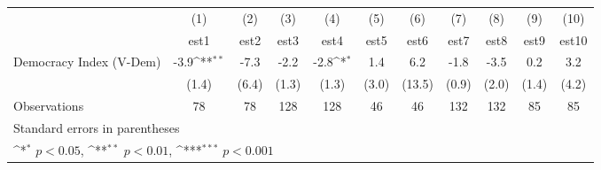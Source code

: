 {
\def\sym#1{\ifmmode^{#1}\else\(^{#1}\)\fi}
\begin{tabular}{l*{10}{c}}
\hline\hline
                    &\multicolumn{1}{c}{(1)}         &\multicolumn{1}{c}{(2)}         &\multicolumn{1}{c}{(3)}         &\multicolumn{1}{c}{(4)}         &\multicolumn{1}{c}{(5)}         &\multicolumn{1}{c}{(6)}         &\multicolumn{1}{c}{(7)}         &\multicolumn{1}{c}{(8)}         &\multicolumn{1}{c}{(9)}         &\multicolumn{1}{c}{(10)}         \\
                    &        est1         &        est2         &        est3         &        est4         &        est5         &        est6         &        est7         &        est8         &        est9         &       est10         \\
\hline
Democracy Index (V-Dem)&        -3.9\sym{**} &        -7.3         &        -2.2         &        -2.8\sym{*}  &         1.4         &         6.2         &        -1.8         &        -3.5         &         0.2         &         3.2         \\
                    &       (1.4)         &       (6.4)         &       (1.3)         &       (1.3)         &       (3.0)         &      (13.5)         &       (0.9)         &       (2.0)         &       (1.4)         &       (4.2)         \\
\hline
Observations        &          78         &          78         &         128         &         128         &          46         &          46         &         132         &         132         &          85         &          85         \\
\hline\hline
\multicolumn{11}{l}{\footnotesize Standard errors in parentheses}\\
\multicolumn{11}{l}{\footnotesize \sym{*} \(p<0.05\), \sym{**} \(p<0.01\), \sym{***} \(p<0.001\)}\\
\end{tabular}
}
